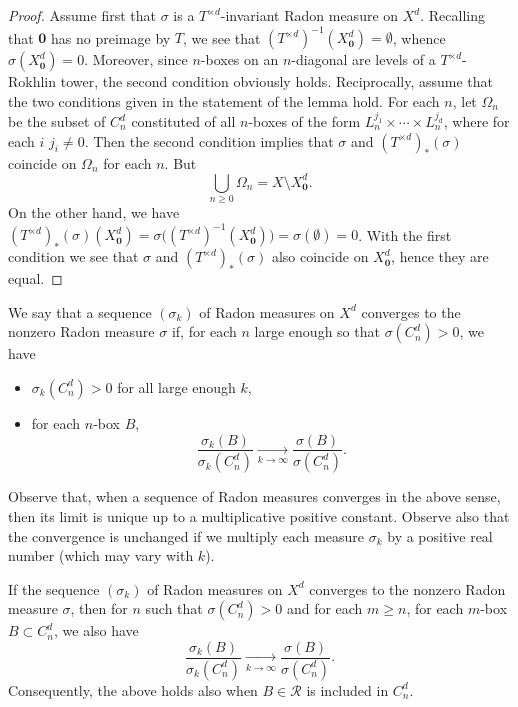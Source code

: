 \documentclass[AHL,Unicode,longabstracts]{cedram}
\newcommand{\tend}[3][]{\xrightarrow[#2\to#3]{#1}}
\newcommand{\cd}{C^{d}}
\newcommand{\td}{T^{\times d}}
\newcommand{\bz}{\boldsymbol{0}}
\newcommand{\ovC}{\Omega}
\begin{document}
\begin{proof}
Assume first that $\sigma$ is a $\td$-invariant Radon measure on $X^d$. Recalling that $\bz$ has no preimage by $T$, we see that $(\td)^{-1}(X_{\bz}^d)=\emptyset$, whence $\sigma\left(X_{\bz}^d\right)=0$. Moreover, since $n$-boxes on an $n$-diagonal are levels of a $\td$-Rokhlin tower, the second condition obviously holds. Reciprocally, assume that the two conditions given in the statement of the lemma hold. For each $n$, let $\ovC_n$ be the subset of $\cd_n$ constituted of all $n$-boxes of the form $L_n^{j_1}\times\cdots\times L_n^{j_d}$, where for each $i$ $j_i\neq 0$. Then the second condition implies that $\sigma$ and $(\td)_*(\sigma)$ coincide on $\ovC_n$ for each $n$. But
\[
\bigcup_{n\ge0} \ovC_n = X\setminus X_{\bz}^d.
\]
On the other hand, we have $(\td)_*(\sigma)(X_{\bz}^d)=\sigma\bigl((\td)^{-1} (X_{\bz}^d)\bigr)=\sigma(\emptyset)=0$. With the first condition we see that $\sigma$ and $(\td)_*(\sigma)$ also coincide on $X_{\bz}^d$, hence they are equal.
\end{proof}

\begin{defi}\label{def:convergence}
We say that a sequence $(\sigma_k)$ of Radon measures on $X^d$ converges to the nonzero Radon measure $\sigma$ if, for each $n$ large enough so that $\sigma(\cd_n)>0$, we have
\begin{itemize}
\item $\sigma_k(\cd_n)>0$ for all large enough $k$,
\item for each $n$-box $B$,
\[
\frac{\sigma_k(B)}{\sigma_k(\cd_n)} \tend{k}{\infty}
\frac{\sigma(B)}{\sigma(\cd_n)}.
\]
\end{itemize}
\end{defi}

Observe that, when a sequence of Radon measures converges in the above sense, then its limit is unique up to a multiplicative positive constant. Observe also that the convergence is unchanged if we multiply each measure $\sigma_k$ by a positive real number (which may vary with $k$).


\begin{rema}\label{rem:mn}
If the sequence $(\sigma_k)$ of Radon measures on $X^d$ converges to the nonzero Radon measure $\sigma$, then for $n$ such that $\sigma(\cd_n)>0$ and for each $m\ge n$, for each $m$-box $B\subset\cd_n$, we also have
\[
\frac{\sigma_k(B)}{\sigma_k(\cd_n)} \tend{k}{\infty}
\frac{\sigma(B)}{\sigma(\cd_n)}.
\]
Consequently, the above holds also when $B\in\mathscr{R}$ is included in $\cd_n$.
\end{rema}
\end{document}
